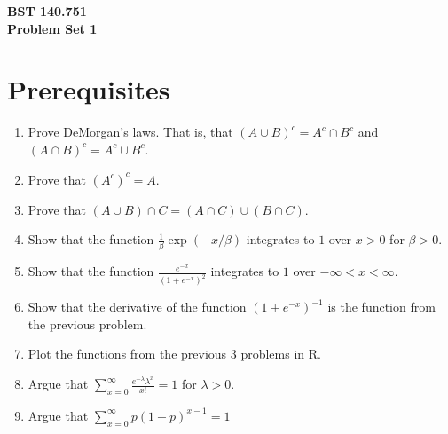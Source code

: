 \documentclass[12pt]{article}
\begin{document}
\noindent
{\bf BST 140.751 \\ Problem Set 1} \\
\section{Prerequisites}
\begin{enumerate}[1.]
\item Prove DeMorgan's laws. That is, that $(A \cup B ) ^c = A^c \cap B^c$ and $(A \cap B) ^ c = A^c \cup B^c$.
\item Prove that $(A^c)^c = A$.
\item Prove that $(A \cup B) \cap C = (A\cap C) \cup (B\cap C)$.
\item Show that the function $\frac{1}{\beta} \exp(-x / \beta)$ integrates to $1$ over $x > 0$ for $\beta > 0$.
\item Show that the function $\frac{e^{-x}}{\left(1+  e^{-x} \right)^2}$ integrates to $1$ over $-\infty < x < \infty$.
\item Show that the derivative of the function $(1 + e^{-x})^{-1}$ is the function from the previous problem.
\item Plot the functions from the previous 3 problems in R.
\item Argue that $\sum_{x=0}^\infty \frac{e^{-\lambda}\lambda^x}{x!} = 1$ for $\lambda > 0$.
\item Argue that $\sum_{x=0}^\infty p(1 - p)^{x-1} = 1$ 
\end{enumerate}
\end{document}

